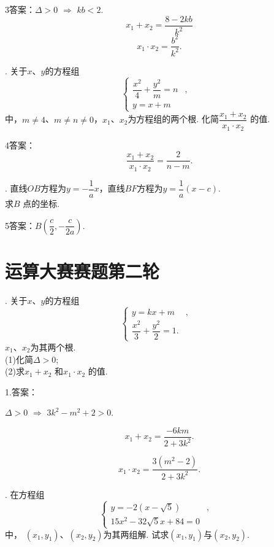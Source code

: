 \documentclass[UTF8]{ctexart}
\begin{document}
%
3答案：$\Delta>0$ $\Rightarrow$ $kb<2$.\\
$$x_1+ x_2=\dfrac{8-2kb}{k^2}$$
 $$x_1\cdot x_2=\dfrac{b^2}{k^2}.$$


 \newpage

. 关于$x$、$y$的方程组\begin{equation*}
\left\{
\begin{aligned}
 \dfrac{x^2}4+\dfrac{y^2}m=n&,& \\
 y=x+m & &
\end{aligned}
\right.
\end{equation*}中，$m\neq4$、$m\neq n\neq 0$，$x_1$、$x_2$为方程组的两个根. 化简$\dfrac{x_1+ x_2}{x_1\cdot x_2}$ 的值.\vspace{3cm}

   
4答案： $$\dfrac{x_1+ x_2}{x_1\cdot x_2}=\dfrac{2}{n-m}.$$

\newpage

 . 直线$OB$方程为$y=-\dfrac1ax$，直线$BF$方程为$y=\dfrac1a(x-c)$.  \\
 求$B$ 点的坐标.\vspace{3cm}

   
5答案：$B(\dfrac{c}{2},-\dfrac{c}{2a}).$

\newpage
\section{运算大赛赛题第二轮}

. 关于$x$、$y$的方程组\begin{equation*}
\left\{
\begin{aligned}
 y=kx+m&,& \\
 \dfrac{x^2}{3}+\dfrac{y^2}2=1.& &
\end{aligned}
\right.
\end{equation*} $x_1$、$x_2$为其两个根. \\
 (1)化简$\Delta>0$;\\
 (2)求$x_1+x_2$ 和$x_1\cdot x_2$ 的值.
\vspace{3cm}

  1.答案：
  
  $\Delta>0$ $\Rightarrow$ $3k^2-m^2+2>0.$
    
  
  $$x_1+ x_2=\dfrac{-6km}{2+3k^2}.$$
  
  $$x_1\cdot x_2=\dfrac{3(m^2-2)}{2+3k^2}.$$


\newpage

 . 在方程组\begin{equation*}
\left\{
\begin{aligned}
 y=-2(x-\sqrt{5})&,& \\
 15x^2-32\sqrt5x+84=0& &
\end{aligned}
\right.
\end{equation*}中， $(x_1,y_1)$、$(x_2,y_2)$为其两组解. 试求$(x_1,y_1)$与$(x_2,y_2)$.
\end{document}
